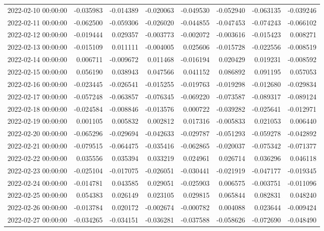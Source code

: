 \begin{tabular}{lrrrrrrr}
2022-02-10 00:00:00 & -0.035983 & -0.014389 & -0.020063 & -0.049530 & -0.052940 & -0.063135 & -0.039246 \\
2022-02-11 00:00:00 & -0.062500 & -0.059306 & -0.026020 & -0.044855 & -0.047453 & -0.074243 & -0.066102 \\
2022-02-12 00:00:00 & -0.019444 & 0.029357 & -0.003773 & -0.002072 & -0.003616 & -0.015423 & 0.008271 \\
2022-02-13 00:00:00 & -0.015109 & 0.011111 & -0.004005 & 0.025606 & -0.015728 & -0.022556 & -0.008519 \\
2022-02-14 00:00:00 & 0.006711 & -0.009672 & 0.011468 & -0.016194 & 0.020429 & 0.019231 & -0.008592 \\
2022-02-15 00:00:00 & 0.056190 & 0.038943 & 0.047566 & 0.041152 & 0.086892 & 0.091195 & 0.057053 \\
2022-02-16 00:00:00 & -0.023445 & -0.026541 & -0.015255 & -0.019763 & -0.019298 & -0.012680 & -0.029834 \\
2022-02-17 00:00:00 & -0.057248 & -0.063857 & -0.076345 & -0.069220 & -0.073587 & -0.089317 & -0.089124 \\
2022-02-18 00:00:00 & -0.024584 & -0.008846 & -0.013576 & 0.000722 & -0.039282 & -0.025641 & -0.012971 \\
2022-02-19 00:00:00 & 0.001105 & 0.005832 & 0.002812 & 0.017316 & -0.005833 & 0.021053 & 0.006440 \\
2022-02-20 00:00:00 & -0.065296 & -0.029694 & -0.042633 & -0.029787 & -0.051293 & -0.059278 & -0.042892 \\
2022-02-21 00:00:00 & -0.079515 & -0.064475 & -0.035416 & -0.062865 & -0.020037 & -0.075342 & -0.071377 \\
2022-02-22 00:00:00 & 0.035556 & 0.035394 & 0.033219 & 0.024961 & 0.026714 & 0.036296 & 0.046118 \\
2022-02-23 00:00:00 & -0.025104 & -0.017075 & -0.026051 & -0.030441 & -0.021919 & -0.047177 & -0.019345 \\
2022-02-24 00:00:00 & -0.014781 & 0.043585 & 0.029051 & -0.025903 & 0.006575 & -0.003751 & -0.011096 \\
2022-02-25 00:00:00 & 0.054383 & 0.026149 & 0.023105 & 0.029815 & 0.065844 & 0.082831 & 0.048240 \\
2022-02-26 00:00:00 & -0.013784 & 0.020172 & -0.002674 & -0.000782 & 0.004088 & 0.023644 & -0.009424 \\
2022-02-27 00:00:00 & -0.034265 & -0.034151 & -0.036281 & -0.037588 & -0.058626 & -0.072690 & -0.048490 \\

\end{tabular}
